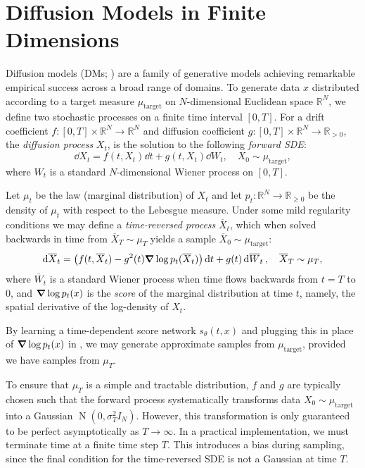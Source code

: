 \section{Diffusion Models in Finite Dimensions}
Diffusion models (DMs; \citealp{song2021scorebasedgenerativemodelingstochastic,hyvarinen2005estimation,ho2020denoisingdiffusionprobabilisticmodels}) are a family of generative models achieving remarkable empirical success across a broad range of domains. To generate data \(x\) distributed according to a target measure \(\mu_{\text{target}}\) on \(N\)-dimensional Euclidean space \(\mathbb{R}^{N}\), we define two stochastic processes on a finite time interval \([0, T]\). For a drift coefficient \(f : [0, T] \times \mathbb{R}^{N} \to \mathbb{R}^{N}\) and diffusion coefficient \(g : [0, T] \times \mathbb{R}^{N} \to \mathbb{R}_{> 0}\), the  \textit{diffusion process} \(X_{t}\), is the solution to the following \textit{forward SDE}:
\[
  \dd{X_{t}} = f(t, X_{t}) \dd{t} + g(t, X_{t}) \dd{W_{t}},\quad X_{0} \sim \mu_{\text{target}},
\]
where \(W_{t}\) is a standard \(N\)-dimensional Wiener process on \([0, T]\).

Let \(\mu_{t}\) be the law (marginal distribution) of \(X_{t}\) and let \(p_{t}: \mathbb{R}^{N} \to \mathbb{R}_{\geq 0}\) be the density of \(\mu_{t}\) with respect to the Lebesgue measure. Under some mild regularity conditions \citep{anderson1982reverse} we may define a \textit{time-reversed process} \(\overline{X}_{t}\), which when solved backwards in time from \(\overline{X}_{T} \sim \mu_{T}\) yields a sample \(\overline{X}_{0} \sim \mu_{\text{target}}\):
\begin{equation}
  \dd{ \overline{X}_{t}} = \qty(f(t, \overline{X}_{t}) - g^{2}(t) \grad \log p_{t}(\overline{X}_{t}))\dd{t} + g(t) \dd{ \overline{W}_{t}},  \quad \overline{X}_{T} \sim \mu_{T}, \label{eqn:dm-reverse}
\end{equation}
where \( \overline{W}_{t}\) is a standard Wiener process when time flows backwards from \(t = T\) to \(0\), and \(\grad \log p_{t}(x)\) is the \textit{score} of the marginal distribution at time \(t\), namely, the spatial derivative of the log-density of \(X_{t}\).

By learning a time-dependent score network \(s_{\theta}(t, x)\) and plugging this in place of \(\grad \log p_{t}(x)\) in , we may generate approximate samples from \(\mu_{\text{target}}\), provided we have samples from \(\mu_{T}\).

To ensure that \(\mu_{T}\) is a simple and tractable distribution, \(f\) and \(g\) are typically chosen such that the forward process systematically transforms data \(X_{0} \sim \mu_{\text{target}}\) into a Gaussian \(\operatorname{N}(0, \sigma^{2}_{T} I_{N})\). However, this transformation is only guaranteed to be perfect asymptotically as \(T \to \infty\). In a practical implementation, we must terminate time at a finite time step \(T\). This introduces a bias during sampling, since the final condition for the time-reversed SDE is not a Gaussian at time \(T\).

